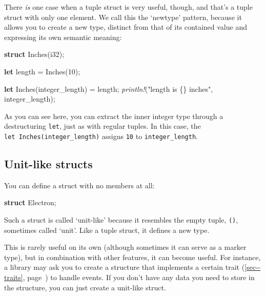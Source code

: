 \documentclass[a4paper,]{book}
\renewcommand*{\hyperref}[2][\ar]{%
  \def\ar{#2}%
  #2 (\autoref{#1}, page~\pageref{#1})}
\newenvironment{Shaded}{\begin{snugshade}}{\end{snugshade}}
\newcommand{\KeywordTok}[1]{\textcolor[rgb]{0.13,0.29,0.53}{\textbf{{#1}}}}
\newcommand{\DataTypeTok}[1]{\textcolor[rgb]{0.13,0.29,0.53}{{#1}}}
\newcommand{\DecValTok}[1]{\textcolor[rgb]{0.00,0.00,0.81}{{#1}}}
\newcommand{\StringTok}[1]{\textcolor[rgb]{0.31,0.60,0.02}{{#1}}}
\newcommand{\PreprocessorTok}[1]{\textcolor[rgb]{0.56,0.35,0.01}{\textit{{#1}}}}
\newcommand{\NormalTok}[1]{{#1}}
\begin{document}
There \emph{is} one case when a tuple struct is very useful, though, and
that's a tuple struct with only one element. We call this the `newtype'
pattern, because it allows you to create a new type, distinct from that
of its contained value and expressing its own semantic meaning:

\begin{Shaded}
\begin{Highlighting}[]
\KeywordTok{struct} \NormalTok{Inches(}\DataTypeTok{i32}\NormalTok{);}

\KeywordTok{let} \NormalTok{length = Inches(}\DecValTok{10}\NormalTok{);}

\KeywordTok{let} \NormalTok{Inches(integer_length) = length;}
\PreprocessorTok{println!}\NormalTok{(}\StringTok{"length is \{\} inches"}\NormalTok{, integer_length);}
\end{Highlighting}
\end{Shaded}

As you can see here, you can extract the inner integer type through a
destructuring \texttt{let}, just as with regular tuples. In this case,
the \texttt{let\ Inches(integer\_length)} assigns \texttt{10} to
\texttt{integer\_length}.

\subsection{Unit-like structs}\label{unit-like-structs}

You can define a struct with no members at all:

\begin{Shaded}
\begin{Highlighting}[]
\KeywordTok{struct} \NormalTok{Electron;}
\end{Highlighting}
\end{Shaded}

Such a struct is called `unit-like' because it resembles the empty
tuple, \texttt{()}, sometimes called `unit'. Like a tuple struct, it
defines a new type.

This is rarely useful on its own (although sometimes it can serve as a
marker type), but in combination with other features, it can become
useful. For instance, a library may ask you to create a structure that
implements a certain \hyperref[sec--traits]{trait} to handle events. If
you don't have any data you need to store in the structure, you can just
create a unit-like struct.

\end{document}
